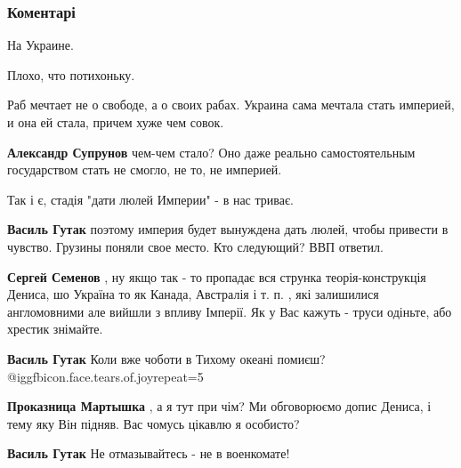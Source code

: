  
 
 
 
 
\subsubsection{Коментарі}
\label{sec:23_10_2021.fb.zharkih_denis.1.russkij_vopros_ukraina.cmt}

\begin{itemize} %
На Украине.

Плохо, что потихоньку.

Раб мечтает не о свободе, а о своих рабах. Украина сама мечтала стать империей, и она ей стала, причем хуже чем совок.

\begin{itemize} %
\textbf{Александр Супрунов} чем-чем стало? Оно даже реально самостоятельным государством стать не смогло, не то, не империей.
\end{itemize} %

Так і є, стадія "дати люлей Империи" - в нас триває.

\begin{itemize} %
\textbf{Василь Гутак} поэтому империя будет вынуждена дать люлей, чтобы привести в чувство. Грузины поняли свое место. Кто следующий? ВВП ответил.

\textbf{Сергей Семенов} , ну якщо так - то пропадає вся струнка теорія-конструкція Дениса, шо Україна то як Канада, Австралія і т. п. , які залишилися англомовними але вийшли з впливу Імперії.
Як у Вас кажуть - труси одіньте, або хрестик знімайте.

\textbf{Василь Гутак} Коли вже чоботи в Тихому океані помиєш? @igg{fbicon.face.tears.of.joy}{repeat=5} 

\textbf{Проказница Мартышка} , а я тут при чім? Ми обговорюємо допис Дениса, і тему яку Він підняв.
Вас чомусь цікавлю я особисто?

\textbf{Василь Гутак} Не отмазывайтесь - не в военкомате!


\end{itemize}
\end{itemize}
